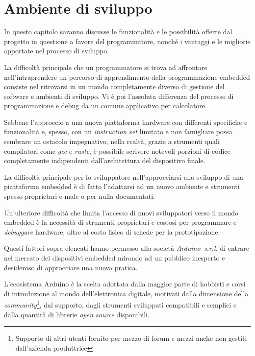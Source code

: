 \chapter{Ambiente di sviluppo}

In questo capitolo saranno discusse le funzionalità e le possibilità offerte dal progetto in questione a favore del programmatore, nonché i vantaggi e le migliorie apportate nel processo di sviluppo.

La difficoltà principale che un programmatore si trova ad affrontare nell'intraprendere un percorso di apprendimento della programmazione embedded consiste nel ritrovarsi in un mondo completamente diverso di gestione del software e ambienti di sviluppo. Vi è poi l'assoluta differenza del processo di programmazione e debug da un comune applicativo per calcolatore.

Sebbene l'approccio a una nuova piattaforma hardware con differenti specifiche e funzionalità e, spesso, con un \textit{instruction set} limitato e non famigliare possa sembrare un ostacolo impegnativo, nella realtà, grazie a strumenti quali compilatori come \textit{gcc} e \textit{rustc}, è possibile scrivere notevoli porzioni di codice completamente indipendenti dall'architettura del dispositivo finale.

La difficoltà principale per lo sviluppatore nell'approcciarsi allo sviluppo di una piattaforma embedded è di fatto l'adattarsi ad un nuovo ambiente e strumenti spesso proprietari e male o per nulla documentati.

Un'ulteriore difficoltà che limita l'accesso di nuovi sviluppatori verso il mondo embedded è la necessità di strumenti proprietari e costosi per programmare e \textit{debuggare} hardware, oltre al costo fisico di schede per la prototipazione.

Questi fattori sopra elencati hanno permesso alla società \textit{Arduino~s.r.l.} di entrare nel mercato dei dispositivi embedded mirando ad un pubblico inesperto e desideroso di approcciare una nuova pratica\cite{site:arduino-about}.

L'ecosistema Arduino è la scelta adottata dalla maggior parte di hobbisti e corsi di introduzione al mondo dell'elettronica digitale, motivati dalla dimensione della \textit{community}\footnote{Supporto di altri utenti fornito per mezzo di forum e mezzi anche non gestiti dall'azienda produttrice}, dal supporto, dagli strumenti sviluppati compatibili e semplici e dalla quantità di librerie \textit{open source} disponibili.

